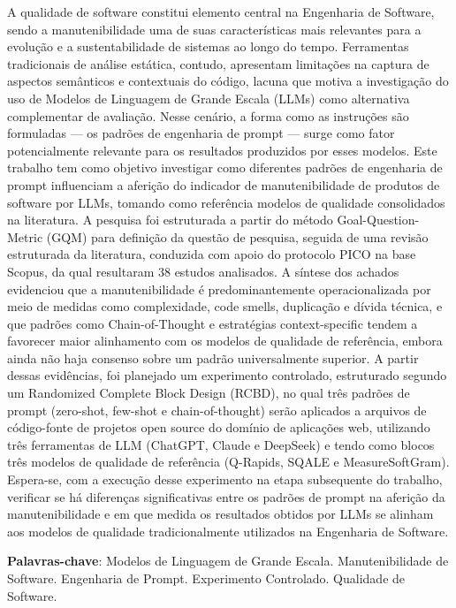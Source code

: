 \begin{resumo}
  A qualidade de software constitui elemento central na Engenharia de Software, sendo a manutenibilidade uma de suas características mais relevantes para a evolução e a sustentabilidade de sistemas ao longo do tempo. Ferramentas tradicionais de análise estática, contudo, apresentam limitações na captura de aspectos semânticos e contextuais do código, lacuna que motiva a investigação do uso de Modelos de Linguagem de Grande Escala (LLMs) como alternativa complementar de avaliação. Nesse cenário, a forma como as instruções são formuladas — os padrões de engenharia de prompt — surge como fator potencialmente relevante para os resultados produzidos por esses modelos. Este trabalho tem como objetivo investigar como diferentes padrões de engenharia de prompt influenciam a aferição do indicador de manutenibilidade de produtos de software por LLMs, tomando como referência modelos de qualidade consolidados na literatura. A pesquisa foi estruturada a partir do método Goal-Question-Metric (GQM) para definição da questão de pesquisa, seguida de uma revisão estruturada da literatura, conduzida com apoio do protocolo PICO na base Scopus, da qual resultaram 38 estudos analisados. A síntese dos achados evidenciou que a manutenibilidade é predominantemente operacionalizada por meio de medidas como complexidade, code smells, duplicação e dívida técnica, e que padrões como Chain-of-Thought e estratégias context-specific tendem a favorecer maior alinhamento com os modelos de qualidade de referência, embora ainda não haja consenso sobre um padrão universalmente superior. A partir dessas evidências, foi planejado um experimento controlado, estruturado segundo um Randomized Complete Block Design (RCBD), no qual três padrões de prompt (zero-shot, few-shot e chain-of-thought) serão aplicados a arquivos de código-fonte de projetos open source do domínio de aplicações web, utilizando três ferramentas de LLM (ChatGPT, Claude e DeepSeek) e tendo como blocos três modelos de qualidade de referência (Q-Rapids, SQALE e MeasureSoftGram). Espera-se, com a execução desse experimento na etapa subsequente do trabalho, verificar se há diferenças significativas entre os padrões de prompt na aferição da manutenibilidade e em que medida os resultados obtidos por LLMs se alinham aos modelos de qualidade tradicionalmente utilizados na Engenharia de Software.

  \vspace{\onelineskip}
     
  \noindent
  \textbf{Palavras-chave}: Modelos de Linguagem de Grande Escala. Manutenibilidade de Software. Engenharia de Prompt. Experimento Controlado. Qualidade de Software.
\end{resumo}
